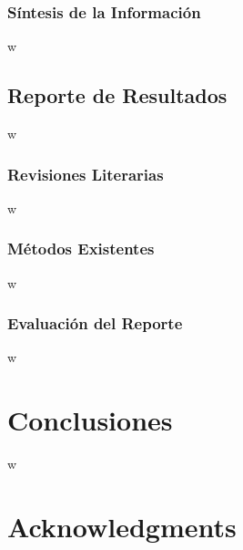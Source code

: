\documentclass[fleqn,10pt]{SelfArx} %
\begin{document}
	\subsubsection{Síntesis de la Información}
    w

\subsection{Reporte de Resultados}
    w
    \subsubsection{Revisiones Literarias}
	w
	\subsubsection{Métodos Existentes}
	w
	\subsubsection{Evaluación del Reporte}
    w
	
\section{Conclusiones}
    w
\section*{Acknowledgments} %





\end{document}

